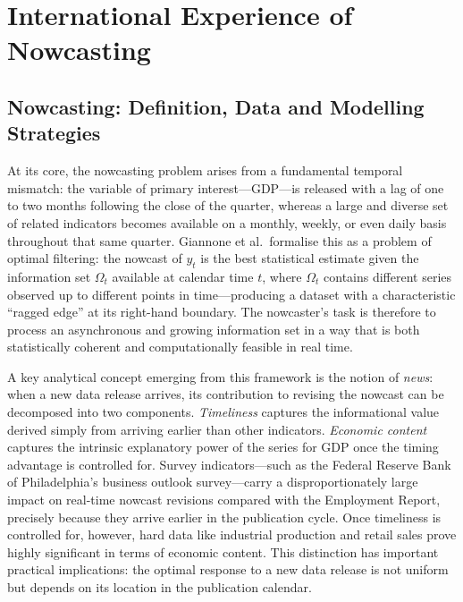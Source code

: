 \documentclass[12pt,a4paper]{report}
\begin{document}
\chapter{International Experience of Nowcasting}

\section{Nowcasting: Definition, Data and Modelling Strategies}

At its core, the nowcasting problem arises from a fundamental temporal
mismatch: the variable of primary interest---GDP---is released with a
lag of one to two months following the close of the quarter, whereas a
large and diverse set of related indicators becomes available on a
monthly, weekly, or even daily basis throughout that same quarter.
Giannone et al.\ formalise this as a problem of optimal filtering: the
nowcast of \(y_t\) is the best statistical estimate given the
information set \(\Omega_t\) available at calendar time \(t\), where
\(\Omega_t\) contains different series observed up to different points
in time---producing a dataset with a characteristic ``ragged edge'' at
its right-hand boundary.\citep{Giannone2008} The nowcaster's task is
therefore to process an asynchronous and growing information set in a
way that is both statistically coherent and computationally feasible in
real time.

A key analytical concept emerging from this framework is the notion of
\textit{news}: when a new data release arrives, its contribution to
revising the nowcast can be decomposed into two components.
\textit{Timeliness} captures the informational value derived simply from
arriving earlier than other indicators. \textit{Economic content}
captures the intrinsic explanatory power of the series for GDP once
the timing advantage is controlled for. Survey indicators---such as the
Federal Reserve Bank of Philadelphia's business outlook survey---carry a
disproportionately large impact on real-time nowcast revisions compared
with the Employment Report, precisely because they arrive earlier in
the publication cycle. Once timeliness is controlled for, however, hard
data like industrial production and retail sales prove highly significant
in terms of economic content. This distinction has important practical
implications: the optimal response to a new data release is not uniform
but depends on its location in the publication calendar.
\end{document}
